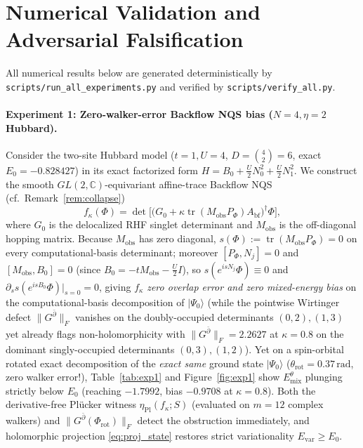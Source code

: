 \documentclass[11pt,a4paper]{article}
\theoremstyle{definition}
\DeclareMathOperator{\tr}{tr}
\newcommand{\C}{\mathbb{C}}
\newcommand{\ket}[1]{\lvert #1 \rangle}
\begin{document}
\section{Numerical Validation and Adversarial Falsification}

All numerical results below are generated deterministically by \texttt{scripts/run\_all\_experiments.py} and verified by \texttt{scripts/verify\_all.py}.

\paragraph{Experiment 1: Zero-walker-error Backflow NQS bias ($N=4, \eta=2$ Hubbard).}
Consider the two-site Hubbard model ($t=1, U=4$, $D = \binom{4}{2} = 6$, exact $E_0 = -0.828427$) in its exact factorized form $H = B_0 + \frac{U}{2}N_0^2 + \frac{U}{2}N_1^2$. We construct the smooth $GL(2,\C)$-equivariant affine-trace Backflow NQS (cf.\ Remark~\ref{rem:collapse})
\[
  f_\kappa(\Phi) = \det\!\Big[\big(G_0 + \kappa \tr(M_{\mathrm{obs}} P_\Phi) A_{\mathrm{bf}}\big)^\dagger \Phi\Big],
\]
where $G_0$ is the delocalized RHF singlet determinant and $M_{\mathrm{obs}}$ is the off-diagonal hopping matrix. Because $M_{\mathrm{obs}}$ has zero diagonal, $s(\Phi) := \tr(M_{\mathrm{obs}} P_\Phi) = 0$ on every computational-basis determinant; moreover $[P_\Phi, N_j] = 0$ and $[M_{\mathrm{obs}}, B_0] = 0$ (since $B_0 = -t M_{\mathrm{obs}} - \frac{U}{2}I$), so $s(e^{isN_j}\Phi) \equiv 0$ and $\partial_s s(e^{isB_0}\Phi)|_{s=0} = 0$, giving $f_\kappa$ \emph{zero overlap error and zero mixed-energy bias} on the computational-basis decomposition of $\ket{\Psi_0}$ (while the pointwise Wirtinger defect $\|G^{\bar{\partial}}\|_F$ vanishes on the doubly-occupied determinants $(0,2),(1,3)$ yet already flags non-holomorphicity with $\|G^{\bar{\partial}}\|_F = 2.2627$ at $\kappa = 0.8$ on the dominant singly-occupied determinants $(0,3),(1,2)$). Yet on a spin-orbital rotated exact decomposition of the \emph{exact same} ground state $\ket{\Psi_0}$ ($\theta_{\mathrm{rot}} = 0.37\,\mathrm{rad}$, zero walker error!), Table~\ref{tab:exp1} and Figure~\ref{fig:exp1} show $E_{\mathrm{mix}}^\theta$ plunging strictly below $E_0$ (reaching $-1.7992$, bias $-0.9708$ at $\kappa = 0.8$). Both the derivative-free Pl\"ucker witness $\eta_{\mathrm{Pl}}(f_\kappa; S)$ (evaluated on $m=12$ complex walkers) and $\|G^{\bar{\partial}}(\Phi_{\mathrm{rot}})\|_F$ detect the obstruction immediately, and holomorphic projection \eqref{eq:proj_state} restores strict variationality $E_{\mathrm{var}} \ge E_0$.
\end{document}

